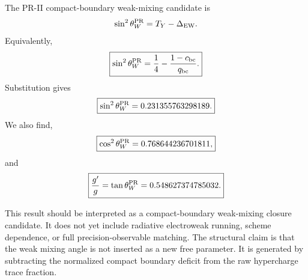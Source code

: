 \documentclass[11pt]{article}
\begin{document}
The PR-II compact-boundary weak-mixing candidate is
\begin{equation}
\sin^2\theta_W^{\rm PR}
=
T_Y
-
\Delta_{\rm EW}.
\end{equation}
Equivalently,
\begin{equation}
\boxed{
\sin^2\theta_W^{\rm PR}
=
\frac14
-
\frac{1-c_{\rm bc}}{q_{\rm bc}}.
}
\end{equation}
Substitution gives
\begin{equation}
\boxed{
\sin^2\theta_W^{\rm PR}
=
0.231355763298189.
}
\end{equation}
We also find,
\begin{equation}
\boxed{
\cos^2\theta_W^{\rm PR}
=
0.768644236701811,
}
\end{equation}
and
\begin{equation}
\boxed{
\frac{g'}{g}
=
\tan\theta_W^{\rm PR}
=
0.548627374785032.
}
\end{equation}

This result should be interpreted as a compact-boundary weak-mixing closure candidate. 
It does not yet include radiative electroweak running, scheme dependence, or full precision-observable matching. 
The structural claim is that the weak mixing angle is not inserted as a new free parameter. 
It is generated by subtracting the normalized compact boundary deficit from the raw hypercharge trace fraction.
\end{document}
